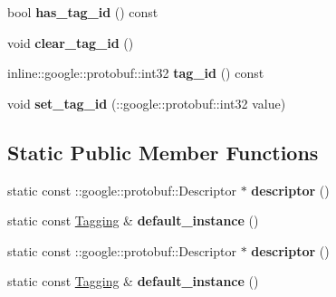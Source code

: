 \begin{DoxyCompactItemize}
\item 
\hypertarget{classTagging_a8ef6eb12fffbe4fbd1b1fc622fc4fb87}{
bool {\bfseries has\_\-tag\_\-id} () const }
\label{classTagging_a8ef6eb12fffbe4fbd1b1fc622fc4fb87}

\item 
\hypertarget{classTagging_a25056abd232cdf45b153cb4b02b82dc2}{
void {\bfseries clear\_\-tag\_\-id} ()}
\label{classTagging_a25056abd232cdf45b153cb4b02b82dc2}

\item 
\hypertarget{classTagging_a2101441b351719ab45adde574a0e7255}{
inline::google::protobuf::int32 {\bfseries tag\_\-id} () const }
\label{classTagging_a2101441b351719ab45adde574a0e7255}

\item 
\hypertarget{classTagging_a44fc9490ab405218c27f13fa056b2ff5}{
void {\bfseries set\_\-tag\_\-id} (::google::protobuf::int32 value)}
\label{classTagging_a44fc9490ab405218c27f13fa056b2ff5}

\end{DoxyCompactItemize}
\subsection*{Static Public Member Functions}
\begin{DoxyCompactItemize}
\item 
\hypertarget{classTagging_a9f5cc87de44fe1c0fe7e599e7585d133}{
static const ::google::protobuf::Descriptor $\ast$ {\bfseries descriptor} ()}
\label{classTagging_a9f5cc87de44fe1c0fe7e599e7585d133}

\item 
\hypertarget{classTagging_a7453824b3d7472a22a1f5fa17db38cf5}{
static const \hyperlink{classTagging}{Tagging} \& {\bfseries default\_\-instance} ()}
\label{classTagging_a7453824b3d7472a22a1f5fa17db38cf5}

\item 
\hypertarget{classTagging_a15430f96418c7b50335efcfe444c841f}{
static const ::google::protobuf::Descriptor $\ast$ {\bfseries descriptor} ()}
\label{classTagging_a15430f96418c7b50335efcfe444c841f}

\item 
\hypertarget{classTagging_a14f13d5d1d6489912bfc06ca67b484f7}{
static const \hyperlink{classTagging}{Tagging} \& {\bfseries default\_\-instance} ()}
\label{classTagging_a14f13d5d1d6489912bfc06ca67b484f7}

\end{DoxyCompactItemize}
